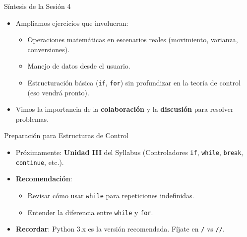 \documentclass[10pt]{beamer}
\begin{document}
\begin{frame}{Síntesis de la Sesión 4}
  \begin{itemize}
    \item Ampliamos ejercicios que involucran:
      \begin{itemize}
        \item Operaciones matemáticas en escenarios reales (movimiento, varianza, conversiones).
        \item Manejo de datos desde el usuario.
        \item Estructuración básica (\texttt{if}, \texttt{for}) sin profundizar en la teoría de control (eso vendrá pronto).
      \end{itemize}
    \item Vimos la importancia de la \textbf{colaboración} y la \textbf{discusión} para resolver problemas.
  \end{itemize}
\end{frame}

\begin{frame}{Preparación para Estructuras de Control}
  \begin{itemize}
    \item Próximamente: \textbf{Unidad III} del Syllabus (Controladores \texttt{if}, \texttt{while}, \texttt{break}, \texttt{continue}, etc.).
    \item \textbf{Recomendación}:
      \begin{itemize}
        \item Revisar cómo usar \texttt{while} para repeticiones indefinidas.
        \item Entender la diferencia entre \texttt{while} y \texttt{for}.
      \end{itemize}
    \item \textbf{Recordar}: Python 3.x es la versión recomendada. Fíjate en \texttt{/} vs \texttt{//}.
  \end{itemize}
\end{frame}
\end{document}
